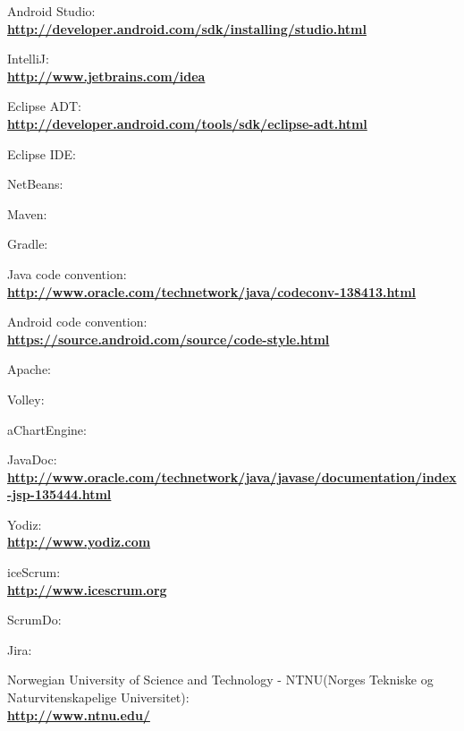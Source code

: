 \begin{thebibliography}{1}
 Android Studio:\\
\textbf{ \url{http://developer.android.com/sdk/installing/studio.html}}

 IntelliJ:\\
\textbf{ \url{http://www.jetbrains.com/idea}}

 Eclipse ADT:\\
\textbf{ \url{http://developer.android.com/tools/sdk/eclipse-adt.html}}

 Eclipse IDE:\\
\textbf{ \url{}}

 NetBeans:\\
\textbf{ \url{}}

 Maven:\\
\textbf{ \url{}}

 Gradle:\\
\textbf{ \url{}}

 Java code convention:\\
\textbf{ \url{http://www.oracle.com/technetwork/java/codeconv-138413.html}}

 Android code convention:\\
\textbf{ \url{https://source.android.com/source/code-style.html}}

 Apache:\\
\textbf{ \url{}}

 Volley:\\
\textbf{ \url{}}

 aChartEngine:\\
\textbf{ \url{}}

 JavaDoc:\\
\textbf{ \url{http://www.oracle.com/technetwork/java/javase/documentation/index-jsp-135444.html}}

 Yodiz: \\
\textbf{ \url{ http://www.yodiz.com}}

 iceScrum: \\
\textbf{ \url{http://www.icescrum.org}}

 ScrumDo:\\
\textbf{ \url{}}

 Jira:\\
\textbf{ \url{}}

 Norwegian University of Science and Technology - NTNU(Norges Tekniske og Naturvitenskapelige Universitet):\\
\textbf{\url{http://www.ntnu.edu/}}



\end{thebibliography}
